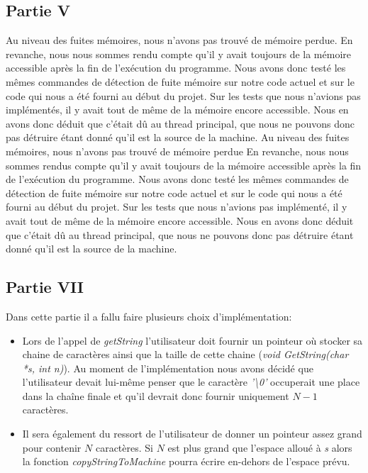 \documentclass{article}
\begin{document}
\subsection{Partie V}
Au niveau des fuites mémoires, nous n'avons pas trouvé de mémoire perdue.  En revanche, nous nous sommes rendu compte qu'il y avait toujours de la mémoire accessible après la fin de l'exécution du programme.
Nous avons donc testé les mêmes commandes de détection de fuite mémoire sur notre code actuel et sur le code qui nous a été fourni au début du projet. Sur les tests que nous n'avions pas implémentés, il y avait tout de même
de la mémoire encore accessible. Nous en avons donc déduit que c'était dû au thread principal, que nous ne pouvons donc pas détruire étant donné qu'il est la source de la machine.
Au niveau des fuites mémoires, nous n'avons pas trouvé de mémoire perdue En revanche, nous nous sommes rendus compte qu'il y avait toujours de la mémoire accessible après la fin de l'exécution du programme.
Nous avons donc testé les mêmes commandes de détection de fuite mémoire sur notre code actuel et sur le code qui nous a été fourni au début du projet. Sur les tests que nous n'avions pas implémenté, il y avait tout de même
de la mémoire encore accessible. Nous en avons donc déduit que c'était dû au thread principal, que nous ne pouvons donc pas détruire étant donné qu'il est la source de la machine.

\subsection{Partie VII}
Dans cette partie il a fallu faire plusieurs choix d'implémentation:
\begin{itemize}
    \item Lors de l'appel de \textit{getString} l'utilisateur doit fournir un pointeur où stocker sa chaine de caractères ainsi que la taille de cette chaine \linebreak (\textit{void GetString(char
    *s, int n)}).
    Au moment de l'implémentation nous avons décidé que l'utilisateur devait lui-même penser que le caractère \textit{'\textbackslash0'} occuperait une place dans la chaîne finale et qu'il devrait
    donc fournir uniquement $N-1$ caractères.
    \item Il sera également du ressort de l'utilisateur de donner un pointeur assez grand pour contenir $N$ caractères. Si $N$ est plus grand que l'espace alloué à \textit{s} alors la fonction
    \textit{copyStringToMachine} pourra écrire en-dehors de l'espace prévu.
\end{itemize}
\end{document}
